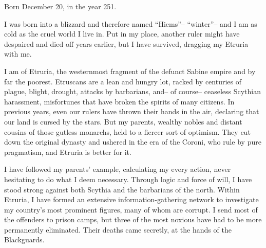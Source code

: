 \documentclass[char]{Kos}
\begin{document}
\name{\cEtruriaKing{}}

Born December 20, in the year 251.

I was born into a blizzard and therefore named ``Hiems''-- ``winter''-- and I am as cold as the cruel world I live in. Put in my place, another ruler might have despaired and died off years earlier, but I have survived, dragging my Etruria with me.

I am \cEtruriaKing{\monarch} of Etruria, the westernmost fragment of the defunct Sabine empire and by far the poorest. Etruscans are a lean and hungry lot, racked by centuries of plague, blight, drought, attacks by barbarians, and-- of course-- ceaseless Scythian harassment, misfortunes that have broken the spirits of many citizens. In previous years, even our rulers have thrown their hands in the air, declaring that our land is cursed by the stars. But my parents, wealthy nobles and distant cousins of those gutless monarchs, held to a fiercer sort of optimism. They cut down the original dynasty and ushered in the era of the Coroni, who rule by pure pragmatism, and Etruria is better for it.

I have followed my parents' example, calculating my every action, never hesitating to do what I deem necessary. Through logic and force of will, I have stood strong against both Scythia and the barbarians of the north. Within Etruria, I have formed an extensive information-gathering network to investigate my country's most prominent figures, many of whom are corrupt. I send most of the offenders to prison camps, but three of the most noxious have had to be more permanently eliminated. Their deaths came secretly, at the hands of the Blackguards.
\end{document}
